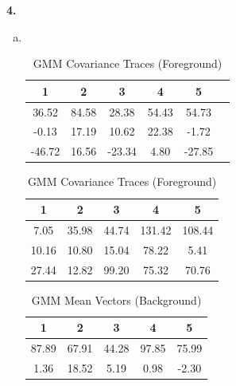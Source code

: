\documentclass{article}
\begin{document}
\textbf{4.} \begin{enumerate}[(a)]
    \item \textcolor{white}{{x}}
    \begin{table}[H]
        \centering
        \captionsetup{width=0.8\linewidth} %
        \begin{minipage}[b]{0.45\linewidth}
            \centering
            \caption{GMM Mean Vectors (Foreground)}
            \begin{tabular}{@{}cccccc@{}}
                \toprule
                 1 & 2 & 3 & 4 & 5\\ \midrule
                 36.52 & 84.58 & 28.38 & 54.43 & 54.73\\
                 -0.13 & 17.19 & 10.62 & 22.38 & -1.72\\
                 -46.72 & 16.56 & -23.34 & 4.80 & -27.85\\ \bottomrule
            \end{tabular}
        \end{minipage}
        \hfill
        \begin{minipage}[b]{0.45\linewidth}
            \centering
            \caption{GMM Covariance Traces (Foreground)}
            \begin{tabular}{@{}ccccc@{}}
                \toprule
                1 & 2 & 3 & 4 & 5\\ \midrule
                7.05 & 35.98 & 44.74 & 131.42 & 108.44\\
                10.16 & 10.80 & 15.04 & 78.22 & 5.41 \\
                27.44 & 12.82 & 99.20 & 75.32 & 70.76\\ \bottomrule
            \end{tabular}
        \end{minipage}
    \end{table}
    \begin{table}[H]
        \centering
        \captionsetup{width=0.8\linewidth} %
        \begin{minipage}[b]{0.45\linewidth}
            \centering
            \caption{GMM Mean Vectors (Background)}
            \begin{tabular}{@{}ccccc@{}}
                \toprule
                1 & 2 & 3 & 4 & 5 \\ \midrule
                87.89 & 67.91 & 44.28 & 97.85 & 75.99\\
                1.36 & 18.52 & 5.19 & 0.98 & -2.30 \\

\end{tabular}
\end{minipage}
\end{table}
\end{enumerate}
\end{document}
